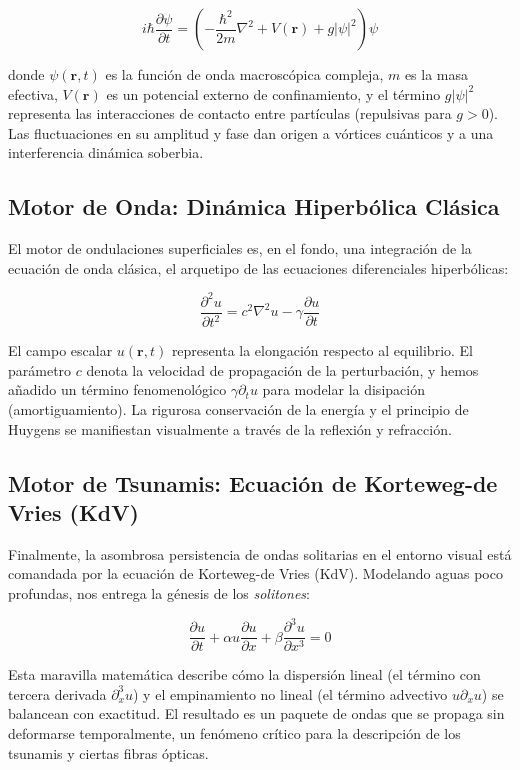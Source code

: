 \documentclass[12pt]{book}
\begin{document}
\begin{equation}
i \hbar \frac{\partial \psi}{\partial t} = \left( -\frac{\hbar^2}{2m} \nabla^2 + V(\mathbf{r}) + g |\psi|^2 \right) \psi
\end{equation}

donde $\psi(\mathbf{r},t)$ es la función de onda macroscópica compleja, $m$ es la masa efectiva, $V(\mathbf{r})$ es un potencial externo de confinamiento, y el término $g |\psi|^2$ representa las interacciones de contacto entre partículas (repulsivas para $g > 0$). Las fluctuaciones en su amplitud y fase dan origen a vórtices cuánticos y a una interferencia dinámica soberbia.

\subsection{Motor de Onda: Dinámica Hiperbólica Clásica}
El motor de ondulaciones superficiales es, en el fondo, una integración de la ecuación de onda clásica, el arquetipo de las ecuaciones diferenciales hiperbólicas:

\begin{equation}
\frac{\partial^2 u}{\partial t^2} = c^2 \nabla^2 u - \gamma \frac{\partial u}{\partial t}
\end{equation}

El campo escalar $u(\mathbf{r},t)$ representa la elongación respecto al equilibrio. El parámetro $c$ denota la velocidad de propagación de la perturbación, y hemos añadido un término fenomenológico $\gamma \partial_t u$ para modelar la disipación (amortiguamiento). La rigurosa conservación de la energía y el principio de Huygens se manifiestan visualmente a través de la reflexión y refracción.

\subsection{Motor de Tsunamis: Ecuación de Korteweg-de Vries (KdV)}
Finalmente, la asombrosa persistencia de ondas solitarias en el entorno visual está comandada por la ecuación de Korteweg-de Vries (KdV). Modelando aguas poco profundas, nos entrega la génesis de los \textit{solitones}:

\begin{equation}
\frac{\partial u}{\partial t} + \alpha u \frac{\partial u}{\partial x} + \beta \frac{\partial^3 u}{\partial x^3} = 0
\end{equation}

Esta maravilla matemática describe cómo la dispersión lineal (el término con tercera derivada $\partial^3_x u$) y el empinamiento no lineal (el término advectivo $u \partial_x u$) se balancean con exactitud. El resultado es un paquete de ondas que se propaga sin deformarse temporalmente, un fenómeno crítico para la descripción de los tsunamis y ciertas fibras ópticas.
\end{document}
